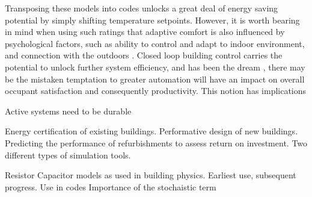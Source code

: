 \item Transposing these models into codes unlocks a great deal of energy saving potential by simply shifting temperature setpoints. However, it is worth bearing in mind when using such ratings that adaptive comfort is also influenced by psychological factors, such as ability to control and adapt to indoor environment, and connection with the outdoors \cite{nicol2002adaptive}. Closed loop building control carries the potential to unlock further system efficiency, and has been the dream , there may be the mistaken temptation to greater automation will have an impact on overall occupant satisfaction and consequently productivity. This notion has implications 

\item Active systems need to be durable

\item 
Energy certification of existing buildings. Performative design of new buildings. Predicting the performance of refurbishments to assess return on investment. Two different types of simulation tools. 
\item
Resistor Capacitor models as used in building physics. Earliest use, subsequent progress. Use in codes
Importance of the stochaistic term \cite{bacher2011identifying}



